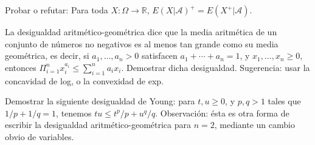 \begin{problem}[2]Probar o refutar:
Para toda $X:\Omega \to \mathbb{R}$, $E(X|  \mathcal{A})^+ = E(X^+|  \mathcal{A})$.
\solution

\begin{expla}

\end{expla}

\end{problem}


\begin{problem}[3]La desigualdad aritm\'etico-geom\'etrica 
dice que la media  aritm\'etica de un conjunto de n\'umeros no negativos es al menos tan grande
como su media  geom\'etrica, es decir, si $a_1, \dots ,a_n > 0$ satisfacen  $a_1 + \cdots  + a_n = 1$,  y  
 $x_1, \dots ,x_n \ge 0$, entonces $\Pi_{i=1}^n x_i^{a_i} \le \sum_{i=1}^n a_i x_i$.
Demostrar dicha desigualdad. Sugerencia: usar la concavidad
de log, o la convexidad de exp.
\solution

\begin{expla}

\end{expla}

\end{problem}


\begin{problem}[4]Demostrar la siguiente desigualdad de Young: para $t, u \ge 0$, y $p,q > 1$ tales que
$1/p + 1/q =1$, tenemos $tu \le t^p/ p + u^q/ q$. Observaci\'on: \'esta es otra forma de
escribir la  desigualdad aritm\'etico-geom\'etrica para $n=2$, mediante un cambio obvio de variables.
\solution

\begin{expla}

\end{expla}

\end{problem}


